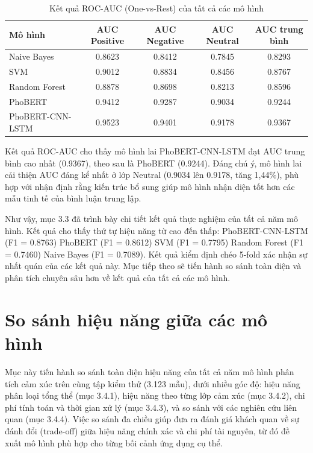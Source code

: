\documentclass[14pt, a4paper]{report}
\begin{document}
\begin{table}[h]
\centering
\caption{Kết quả ROC-AUC (One-vs-Rest) của tất cả các mô hình}
\begin{tabular}{|l|c|c|c|c|}
\hline
\textbf{Mô hình} & \textbf{AUC Positive} & \textbf{AUC Negative} & \textbf{AUC Neutral} & \textbf{AUC trung bình} \\
\hline
Naive Bayes & 0.8623 & 0.8412 & 0.7845 & 0.8293 \\
\hline
SVM & 0.9012 & 0.8834 & 0.8456 & 0.8767 \\
\hline
Random Forest & 0.8878 & 0.8698 & 0.8213 & 0.8596 \\
\hline
PhoBERT & 0.9412 & 0.9287 & 0.9034 & 0.9244 \\
\hline
PhoBERT-CNN-LSTM & 0.9523 & 0.9401 & 0.9178 & 0.9367 \\
\hline
\end{tabular}
\end{table}


Kết quả ROC-AUC cho thấy mô hình lai PhoBERT-CNN-LSTM đạt AUC trung bình cao nhất (0.9367), theo sau là PhoBERT (0.9244). Đáng chú ý, mô hình lai cải thiện AUC đáng kể nhất ở lớp Neutral (0.9034 lên 0.9178, tăng 1,44\%), phù hợp với nhận định rằng kiến trúc bổ sung giúp mô hình nhận diện tốt hơn các mẫu tinh tế của bình luận trung lập.


Như vậy, mục 3.3 đã trình bày chi tiết kết quả thực nghiệm của tất cả năm mô hình. Kết quả cho thấy thứ tự hiệu năng từ cao đến thấp: PhoBERT-CNN-LSTM (F1 = 0.8763) \> PhoBERT (F1 = 0.8612) \> SVM (F1 = 0.7795) \> Random Forest (F1 = 0.7460) \> Naive Bayes (F1 = 0.7089). Kết quả kiểm định chéo 5-fold xác nhận sự nhất quán của các kết quả này. Mục tiếp theo sẽ tiến hành so sánh toàn diện và phân tích chuyên sâu hơn về kết quả của tất cả các mô hình.


\section{So sánh hiệu năng giữa các mô hình}


Mục này tiến hành so sánh toàn diện hiệu năng của tất cả năm mô hình phân tích cảm xúc trên cùng tập kiểm thử (3.123 mẫu), dưới nhiều góc độ: hiệu năng phân loại tổng thể (mục 3.4.1), hiệu năng theo từng lớp cảm xúc (mục 3.4.2), chi phí tính toán và thời gian xử lý (mục 3.4.3), và so sánh với các nghiên cứu liên quan (mục 3.4.4). Việc so sánh đa chiều giúp đưa ra đánh giá khách quan về sự đánh đổi (trade-off) giữa hiệu năng chính xác và chi phí tài nguyên, từ đó đề xuất mô hình phù hợp cho từng bối cảnh ứng dụng cụ thể.
\end{document}
